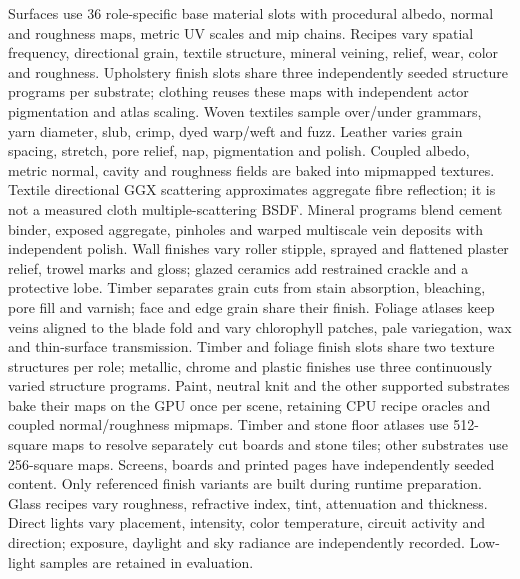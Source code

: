 \documentclass{article}
\begin{document}
Surfaces use 36 role-specific base material slots with procedural albedo, normal and roughness maps, metric UV scales and mip chains. Recipes vary spatial frequency, directional grain, textile structure, mineral veining, relief, wear, color and roughness. Upholstery finish slots share three independently seeded structure programs per substrate; clothing reuses these maps with independent actor pigmentation and atlas scaling. Woven textiles sample over/under grammars, yarn diameter, slub, crimp, dyed warp/weft and fuzz. Leather varies grain spacing, stretch, pore relief, nap, pigmentation and polish. Coupled albedo, metric normal, cavity and roughness fields are baked into mipmapped textures. Textile directional GGX scattering approximates aggregate fibre reflection; it is not a measured cloth multiple-scattering BSDF. Mineral programs blend cement binder, exposed aggregate, pinholes and warped multiscale vein deposits with independent polish. Wall finishes vary roller stipple, sprayed and flattened plaster relief, trowel marks and gloss; glazed ceramics add restrained crackle and a protective lobe. Timber separates grain cuts from stain absorption, bleaching, pore fill and varnish; face and edge grain share their finish. Foliage atlases keep veins aligned to the blade fold and vary chlorophyll patches, pale variegation, wax and thin-surface transmission. Timber and foliage finish slots share two texture structures per role; metallic, chrome and plastic finishes use three continuously varied structure programs. Paint, neutral knit and the other supported substrates bake their maps on the GPU once per scene, retaining CPU recipe oracles and coupled normal/roughness mipmaps. Timber and stone floor atlases use 512-square maps to resolve separately cut boards and stone tiles; other substrates use 256-square maps. Screens, boards and printed pages have independently seeded content. Only referenced finish variants are built during runtime preparation. Glass recipes vary roughness, refractive index, tint, attenuation and thickness. Direct lights vary placement, intensity, color temperature, circuit activity and direction; exposure, daylight and sky radiance are independently recorded. Low-light samples are retained in evaluation.
\end{document}
